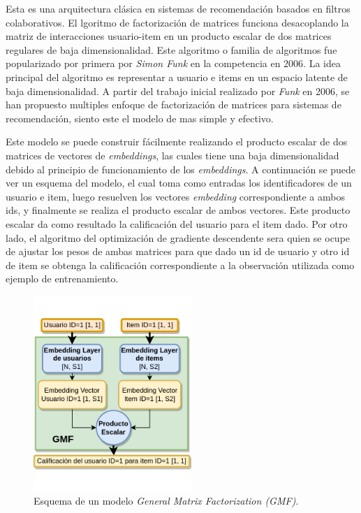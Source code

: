 \documentclass[11pt,a4paper,twoside]{thesis}
\begin{document}
Esta es una arquitectura clásica en sistemas de recomendación basados en filtros colaborativos. El lgoritmo de factorización de matrices \cite{afm} funciona desacoplando la matriz de interacciones usuario-item en un producto escalar de dos matrices regulares de baja dimensionalidad. Este algoritmo o familia de algoritmos fue popularizado por primera por \textit{Simon Funk} en la competencia \cite{netflixprize} en 2006. La idea principal del algoritmo es representar a usuario e items en un espacio latente de baja dimensionalidad.
A partir del trabajo inicial realizado por  \textit{Funk} en 2006, se han propuesto multiples enfoque de factorización de matrices para sistemas de recomendación, siento este el modelo de mas simple y efectivo.

Este modelo se puede construir fácilmente realizando el producto escalar de dos matrices de vectores de \textit{embeddings}, las cuales tiene una baja dimensionalidad debido al principio de funcionamiento de los \textit{embeddings}. A continuación se puede ver un esquema del modelo, el cual toma como entradas los identificadores de un usuario e item, luego resuelven los vectores \textit{embedding} correspondiente a ambos ids, y finalmente se realiza el producto escalar de ambos vectores. Este producto escalar da como resultado la calificación del usuario para el item dado. Por otro lado, el algoritmo del optimización de gradiente descendente sera quien se ocupe de ajustar los pesos de ambas matrices para que dado un id de usuario y otro id de item se obtenga la calificación correspondiente a la observación utilizada como ejemplo de entrenamiento.

\begin{figure}[h!]
	\centering
	\includegraphics[width=6cm]{./images/GMF.png}
	\caption{
		Esquema de un modelo \textit{General Matrix Factorization (GMF)}.
	}
	\label{fig:GMFModel}
\end{figure}
\end{document}
